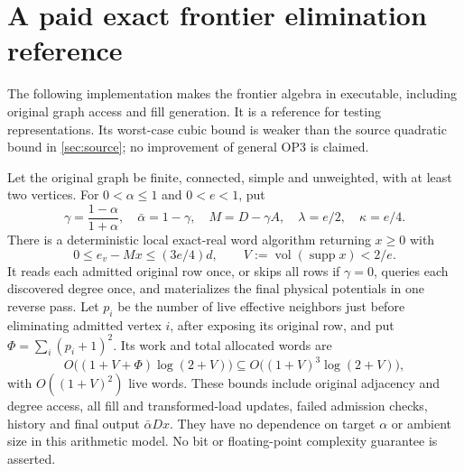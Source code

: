\section{A paid exact frontier elimination reference}
\label{sec:op3-exact-frontier}

The following implementation makes the frontier algebra in
 executable, including original graph
access and fill generation. It is a reference for testing representations.
Its worst-case cubic bound is weaker than the source quadratic bound in
\cref{sec:source}; no improvement of general OP3 is claimed.

\begin{theorem}
\label{thm:op3-exact-frontier}
Let the original graph be finite, connected, simple and unweighted, with
at least two vertices. For $0<\alpha\leq1$ and $0<e<1$, put
\[
 \gamma=\frac{1-\alpha}{1+\alpha},\quad \bar\alpha=1-\gamma,
 \quad M=D-\gamma A,\quad \lambda=e/2,\quad \kappa=e/4.
\]
There is a deterministic local exact-real word algorithm returning $x\geq0$
with
\[
 0\leq e_v-Mx\leq(3e/4)d,\qquad
 V:=\operatorname{vol}(\operatorname{supp}x)<2/e.
\]
It reads each admitted original row once, or skips all rows if $\gamma=0$,
queries each discovered degree once, and materializes the final physical
potentials in one reverse pass. Let $p_i$ be the number of live effective
neighbors just before eliminating admitted vertex $i$, after exposing its
original row, and put $\Phi=\sum_i(p_i+1)^2$. Its work and total allocated
words are
\[
 O\bigl((1+V+\Phi)\log(2+V)\bigr)
 \subseteq O\bigl((1+V)^3\log(2+V)\bigr),
\]
with $O((1+V)^2)$ live words. These bounds include original adjacency and
degree access, all fill and transformed-load updates, failed admission
checks, history and final output $\bar\alpha D x$. They have no dependence
on target $\alpha$ or ambient size in this arithmetic model. No bit or
floating-point complexity guarantee is asserted.
\end{theorem}
